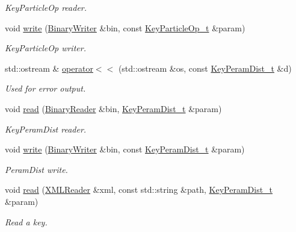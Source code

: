 \begin{DoxyCompactItemize}
\begin{DoxyCompactList}\small\item\em Key\+Particle\+Op reader. \end{DoxyCompactList}\item 
void \mbox{\hyperlink{namespaceHadron_a4330be9331eb4c839e7e123f5306560b}{write}} (\mbox{\hyperlink{classADATIO_1_1BinaryWriter}{Binary\+Writer}} \&bin, const \mbox{\hyperlink{structHadron_1_1KeyParticleOp__t}{Key\+Particle\+Op\+\_\+t}} \&param)
\begin{DoxyCompactList}\small\item\em Key\+Particle\+Op writer. \end{DoxyCompactList}\item 
std\+::ostream \& \mbox{\hyperlink{namespaceHadron_a42b0be53de314a1cf2c05e7d4d4a34d9}{operator$<$$<$}} (std\+::ostream \&os, const \mbox{\hyperlink{structHadron_1_1KeyPeramDist__t}{Key\+Peram\+Dist\+\_\+t}} \&d)
\begin{DoxyCompactList}\small\item\em Used for error output. \end{DoxyCompactList}\item 
void \mbox{\hyperlink{namespaceHadron_ac70286e9fd2f4a9ddf81f9235d1812e8}{read}} (\mbox{\hyperlink{classADATIO_1_1BinaryReader}{Binary\+Reader}} \&bin, \mbox{\hyperlink{structHadron_1_1KeyPeramDist__t}{Key\+Peram\+Dist\+\_\+t}} \&param)
\begin{DoxyCompactList}\small\item\em Key\+Peram\+Dist reader. \end{DoxyCompactList}\item 
void \mbox{\hyperlink{namespaceHadron_a1f7e7b8c782fddd330a9f4491bd37e22}{write}} (\mbox{\hyperlink{classADATIO_1_1BinaryWriter}{Binary\+Writer}} \&bin, const \mbox{\hyperlink{structHadron_1_1KeyPeramDist__t}{Key\+Peram\+Dist\+\_\+t}} \&param)
\begin{DoxyCompactList}\small\item\em Peram\+Dist write. \end{DoxyCompactList}\item 
void \mbox{\hyperlink{namespaceHadron_a55b9ba85a8d8e17d95217275193fb013}{read}} (\mbox{\hyperlink{classADATXML_1_1XMLReader}{X\+M\+L\+Reader}} \&xml, const std\+::string \&path, \mbox{\hyperlink{structHadron_1_1KeyPeramDist__t}{Key\+Peram\+Dist\+\_\+t}} \&param)
\begin{DoxyCompactList}\small\item\em Read a key. \end{DoxyCompactList}\item 

\end{DoxyCompactItemize}

